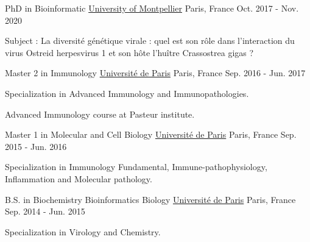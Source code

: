 

\begin{cventries}

  \cventry
    {PhD in Bioinformatic} %
    {\href{https://www.umontpellier.fr/en/}{University of Montpellier}} %
    {Paris, France} %
    {Oct. 2017 - Nov. 2020} %
    {
      \begin{cvitems} %
        \item {Subject : La diversité génétique virale : quel est son rôle dans l'interaction du virus Ostreid herpesvirus 1 et son hôte l’huître Crassostrea gigas ?}
      \end{cvitems}
    }

  \cventry
    {Master 2 in Immunology} %
    {\href{https://u-paris.fr/en/universite-de-paris/}{Université de Paris}} %
    {Paris, France} %
    {Sep. 2016 - Jun. 2017} %
    {
      \begin{cvitems} %
        \item {Specialization in Advanced Immunology and Immunopathologies.}
        \item {Advanced Immunology course at Pasteur institute.}
      \end{cvitems}
    }

  \cventry
    {Master 1 in  Molecular and Cell Biology} %
    {\href{https://u-paris.fr/en/universite-de-paris/}{Université de Paris}} %
    {Paris, France} %
    {Sep. 2015 - Jun. 2016} %
    {
      \begin{cvitems} %
        \item {Specialization in Immunology Fundamental, Immune-pathophysiology, Inflammation and Molecular pathology.}
      \end{cvitems}
    }

  \cventry
    {B.S. in Biochemistry Bioinformatics Biology} %
    {\href{https://u-paris.fr/en/universite-de-paris/}{Université de Paris}} %
    {Paris, France} %
    {Sep. 2014 - Jun. 2015} %
    {
      \begin{cvitems} %
        \item {Specialization in Virology and Chemistry.}
      \end{cvitems}
    }
    

\end{cventries}
